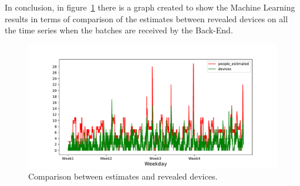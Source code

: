 
In conclusion, in figure~\ref{fig:devicespredictions} there is a graph created to show the Machine Learning results in terms of comparison of the estimates between revealed devices on all the time series when the batches are received by the Back-End.

\begin{figure}[h]
\centering 
\includegraphics[width=1\textwidth]{images/devicespredictions} 
\caption{Comparison between estimates and revealed devices.}
\label{fig:devicespredictions}
\end{figure}

